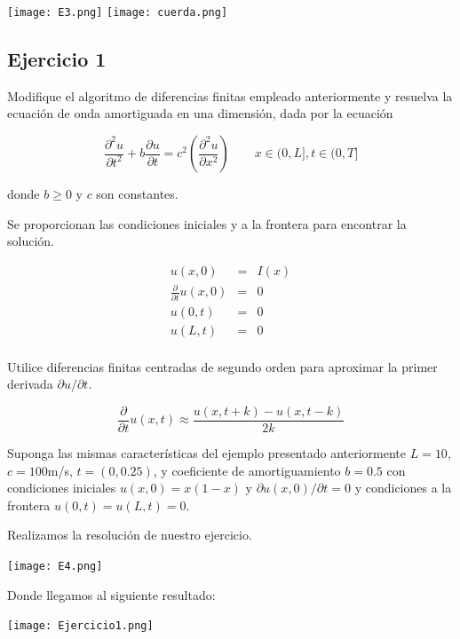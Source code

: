 \documentclass[12pt]{article}
\begin{document}
\begin{center}
    \texttt{[image: E3.png]}
    \texttt{[image: cuerda.png]}
\end{center}

 



\subsection{Ejercicio 1}

Modifique el algoritmo de diferencias finitas empleado anteriormente y resuelva la ecuación de onda amortiguada en una dimensión, dada por la ecuación

\begin{equation*}
\frac{\partial^2 u}{\partial t^2} + 
 b \frac{\partial u}{\partial t}
 = c^2 \left( 
  \frac{\partial^2 u}{\partial x^2}
   \right) \qquad x \in (0,L], t \in (0,T]
\end{equation*}

donde $b \ge 0 $ y $c$ son constantes. 

Se proporcionan las condiciones iniciales y a la frontera para encontrar la solución.

\begin{eqnarray*}
u(x,0) & = & I(x) \\
\frac{\partial}{\partial t} u(x,0) & = & 0 \\
u(0,t) & = & 0 \\
u(L,t) & = & 0 \\
\end{eqnarray*}

Utilice diferencias finitas centradas de segundo orden para aproximar la primer derivada $\partial u/\partial t$.

\begin{equation*}
\frac{\partial}{\partial t} u(x,t) \approx \frac{u(x,t+k) - u(x,t-k)}{2k}
\end{equation*}

Suponga las mismas características del ejemplo presentado anteriormente $L=10$, $c=100$m/s, $t=(0,0.25)$, y coeficiente de amortiguamiento $b=0.5$ con condiciones iniciales $u(x,0) = x(1-x)$ y $\partial u(x,0) / \partial t = 0$ y condiciones a la frontera $u(0,t)=u(L,t)=0$. 

Realizamos la resolución de nuestro ejercicio.

\begin{center}
    \texttt{[image: E4.png]}
    
    Donde llegamos al siguiente resultado:
    
    \texttt{[image: Ejercicio1.png]}
\end{center}
\end{document}
